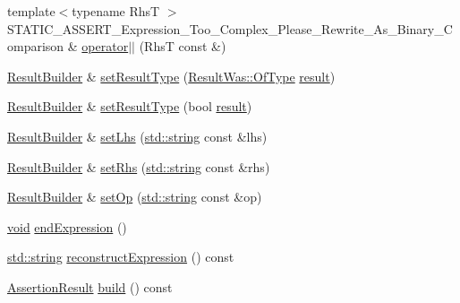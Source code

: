 \begin{DoxyCompactItemize}
\item 
{\footnotesize template$<$typename RhsT $>$ }\\S\+T\+A\+T\+I\+C\+\_\+\+A\+S\+S\+E\+R\+T\+\_\+\+Expression\+\_\+\+Too\+\_\+\+Complex\+\_\+\+Please\+\_\+\+Rewrite\+\_\+\+As\+\_\+\+Binary\+\_\+\+Comparison \& \hyperlink{class_catch_1_1_result_builder_ad489243e89e9f0ec3cb1f95392a537de}{operator$\vert$$\vert$} (RhsT const \&)
\item 
\hyperlink{class_catch_1_1_result_builder}{Result\+Builder} \& \hyperlink{class_catch_1_1_result_builder_af896e372db9d7fc90ddeceff3ad110d0}{set\+Result\+Type} (\hyperlink{struct_catch_1_1_result_was_a624e1ee3661fcf6094ceef1f654601ef}{Result\+Was\+::\+Of\+Type} \hyperlink{_s_d_l__opengl__glext_8h_a321ff419cd5252e54cf95e64dc6687ee}{result})
\item 
\hyperlink{class_catch_1_1_result_builder}{Result\+Builder} \& \hyperlink{class_catch_1_1_result_builder_ae504348b073d0360bfd5fc33347ec689}{set\+Result\+Type} (bool \hyperlink{_s_d_l__opengl__glext_8h_a321ff419cd5252e54cf95e64dc6687ee}{result})
\item 
\hyperlink{class_catch_1_1_result_builder}{Result\+Builder} \& \hyperlink{class_catch_1_1_result_builder_a5de584deec90fc6b7cc5bcf9eb636442}{set\+Lhs} (\hyperlink{_s_d_l__opengl__glext_8h_ae84541b4f3d8e1ea24ec0f466a8c568b}{std\+::string} const \&lhs)
\item 
\hyperlink{class_catch_1_1_result_builder}{Result\+Builder} \& \hyperlink{class_catch_1_1_result_builder_aaeb41a00cf352c7a0bcf75a0ded0a4a2}{set\+Rhs} (\hyperlink{_s_d_l__opengl__glext_8h_ae84541b4f3d8e1ea24ec0f466a8c568b}{std\+::string} const \&rhs)
\item 
\hyperlink{class_catch_1_1_result_builder}{Result\+Builder} \& \hyperlink{class_catch_1_1_result_builder_a8232ed051ed7f6adfbc152c98aa1dc0c}{set\+Op} (\hyperlink{_s_d_l__opengl__glext_8h_ae84541b4f3d8e1ea24ec0f466a8c568b}{std\+::string} const \&op)
\item 
\hyperlink{_s_d_l__opengles2__gl2ext_8h_ae5d8fa23ad07c48bb609509eae494c95}{void} \hyperlink{class_catch_1_1_result_builder_a75ac2dbabd8d4b4b3a75de9bbc3abf02}{end\+Expression} ()
\item 
\hyperlink{_s_d_l__opengl__glext_8h_ae84541b4f3d8e1ea24ec0f466a8c568b}{std\+::string} \hyperlink{class_catch_1_1_result_builder_ad34bc9b83d5cbd5d960903e5a3c6c96c}{reconstruct\+Expression} () const 
\item 
\hyperlink{class_catch_1_1_assertion_result}{Assertion\+Result} \hyperlink{class_catch_1_1_result_builder_a31eba48feb02817d2151e31bd8331eeb}{build} () const 

\end{DoxyCompactItemize}
